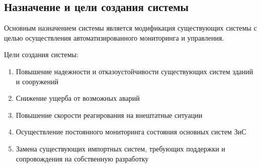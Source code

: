 \subsection{Назначение и цели создания системы}
Основным назначением системы является модификация существующих системы с целью осуществления автоматизированного мониторинга и управления.

Цели создания системы:
\begin{enumerate}
	\itemsep0em
	\item Повышение надежности и отказоустойчивости существующих систем зданий и сооружений
	\item Снижение ущерба от возможных аварий
	\item Повышение скорости реагирования на внештатные ситуации
	\item Осуществление постоянного мониторинга состояния основных систем ЗиС
	\item Замена существующих импортных систем, требующих поддержки и сопровождения на собственную разработку
\end{enumerate}